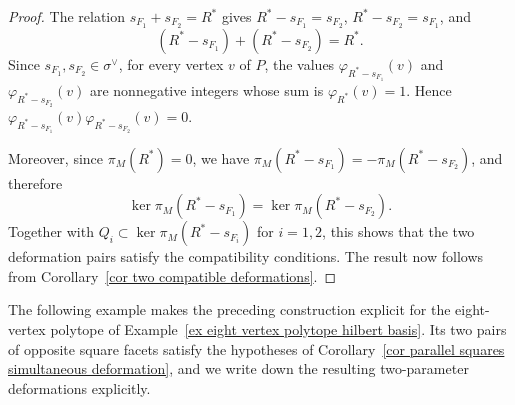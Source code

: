 \documentclass[11pt]{amsart}
\numberwithin{equation}{section}
\theoremstyle{plain}
\theoremstyle{definition}
\newcommand{\0}{$0$-mutable}
\renewcommand{\1}{$1$-rigid}
\renewcommand{\0}{$0$-mutable}
\begin{document}
\begin{proof}
The relation \(s_{F_1}+s_{F_2}=R^*\) gives
\(R^*-s_{F_1}=s_{F_2}\), \(R^*-s_{F_2}=s_{F_1}\), and
$$(R^*-s_{F_1})+(R^*-s_{F_2})=R^*.$$ Since
\(s_{F_1},s_{F_2}\in\sigma^\vee\), for every vertex \(v\) of \(P\),
the values \(\varphi_{R^*-s_{F_1}}(v)\) and
\(\varphi_{R^*-s_{F_2}}(v)\) are nonnegative integers whose sum is
\(\varphi_{R^*}(v)=1\). Hence
\(\varphi_{R^*-s_{F_1}}(v)\varphi_{R^*-s_{F_2}}(v)=0\).

Moreover, since \(\pi_M(R^*)=0\), we have
\(\pi_M(R^*-s_{F_1})=-\pi_M(R^*-s_{F_2})\), and therefore
$$\ker\pi_M(R^*-s_{F_1})=\ker\pi_M(R^*-s_{F_2}).$$
Together with \(Q_i\subset\ker\pi_M(R^*-s_{F_i})\) for \(i=1,2\),
this shows that the two deformation pairs satisfy the compatibility
conditions. The result now follows from
Corollary~\ref{cor two compatible deformations}.
\end{proof}







{
The following example makes the preceding construction explicit for the
eight-vertex polytope of
Example~\ref{ex eight vertex polytope hilbert basis}. Its two pairs of
opposite square facets satisfy the hypotheses of
Corollary~\ref{cor parallel squares simultaneous deformation}, and we
write down the resulting two-parameter deformations explicitly.
}
\end{document}
